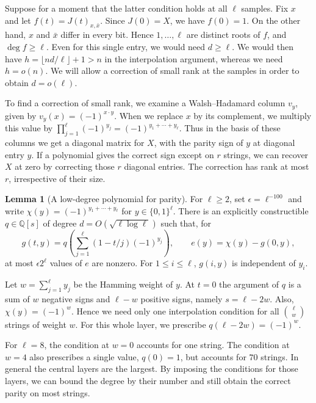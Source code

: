 \documentclass{article}
\theoremstyle{definition}
\newtheorem{lemma}[theorem]{Lemma}
\begin{document}
Suppose for a moment that the latter condition holds at all \(\ell\)
samples. Fix \(x\) and let \(f(t)=J(t)_{x,\bar x}\). Since
\(J(0)=X\), we have \(f(0)=1\). On the other hand, \(x\) and \(\bar x\)
differ in every bit. Hence \(1,\ldots,\ell\) are distinct roots of
\(f\), and \(\deg f\ge\ell\). Even for this single entry, we would need \(d\ge\ell\). We would
then have \(h=\lfloor nd/\ell\rfloor+1>n\) in the interpolation
argument, whereas we need \(h=o(n)\). We will allow a correction of
small rank at the samples in order to obtain \(d=o(\ell)\).

To find a correction of small rank, we examine a Walsh--Hadamard column
\(v_y\), given by \(v_y(x)=(-1)^{x\cdot y}\). When we replace \(x\)
by its complement, we multiply this value by
\(\prod_{j=1}^{\ell}(-1)^{y_j}=(-1)^{y_1+\cdots+y_\ell}\).
Thus in the basis of these columns we get a diagonal matrix for
\(X\), with the parity sign of \(y\) at diagonal entry \(y\). If a
polynomial gives the correct sign except on \(r\) strings, we can
recover \(X\) at zero by correcting those \(r\) diagonal entries.
The correction has rank at most \(r\), irrespective of their size.

\begin{lemma}[A low-degree polynomial for parity]\label{lem:parity}
For \(\ell\ge2\), set \(\epsilon=\ell^{-100}\) and write
\(\chi(y)=(-1)^{y_1+\cdots+y_\ell}\) for \(y\in\{0,1\}^{\ell}\).
There is an explicitly constructible \(q\in\mathbb Q[s]\) of degree
\(d=O(\sqrt{\ell\log\ell})\) such that, for
\[
    g(t,y)=q\!\left(\sum_{j=1}^{\ell}(1-t/j)(-1)^{y_j}\right),
    \qquad e(y)=\chi(y)-g(0,y),
\]
at most \(\epsilon 2^\ell\) values of \(e\) are nonzero. For
\(1\le i\le\ell\), \(g(i,y)\) is independent of \(y_i\).
\end{lemma}

Let \(w=\sum_{j=1}^{\ell}y_j\) be the Hamming weight of \(y\). At
\(t=0\) the argument of \(q\) is a sum of \(w\) negative signs and
\(\ell-w\) positive signs, namely \(s=\ell-2w\). Also,
\(\chi(y)=(-1)^w\). Hence we need only one interpolation condition for all
\(\binom{\ell}{w}\) strings of weight \(w\). For this whole layer,
we prescribe \(q(\ell-2w)=(-1)^w\).

For \(\ell=8\), the condition at \(w=0\) accounts for one string.
The condition at \(w=4\) also prescribes a single value, \(q(0)=1\),
but accounts for \(70\) strings. In general the central layers are
the largest. By imposing the conditions for those layers, we can
bound the degree by their number and still obtain the correct parity
on most strings.
\end{document}
